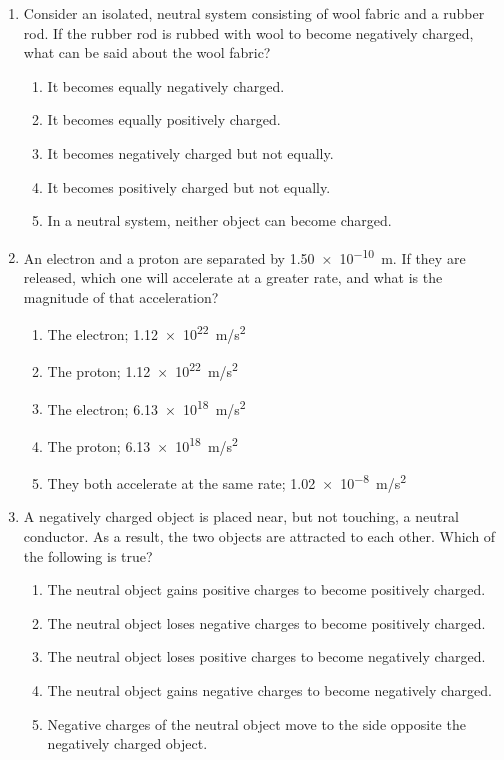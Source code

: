 \documentclass{../../../oss-apphys}
\begin{document}
\begin{multicols*}{2}
\begin{enumerate}[leftmargin=18pt]
  \item Consider an isolated, neutral system consisting of wool fabric and a
    rubber rod. If the rubber rod is rubbed with wool to become negatively
    charged, what can be said about the wool fabric?
    \begin{enumerate}[nosep,leftmargin=18pt,label=(\Alph*)]
    \item It becomes equally negatively charged.
    \item It becomes equally positively charged.
    \item It becomes negatively charged but not equally.
    \item It becomes positively charged but not equally.
    \item In a neutral system, neither object can become charged.
    \end{enumerate}
    \columnbreak
    
  \item An electron and a proton are separated by \SI{1.50e-10}{m}. If they are
    released, which one will accelerate at a greater rate, and what is the
    magnitude of that acceleration?
    \begin{enumerate}[nosep,leftmargin=18pt,label=(\Alph*)]
    \item The electron; \SI{1.12e22}{m/s^2}
    \item The proton; \SI{1.12e22}{m/s^2}
    \item The electron; \SI{6.13e18}{m/s^2}
    \item The proton; \SI{6.13e18}{m/s^2}
    \item They both accelerate at the same rate; \SI{1.02e-8}{m/s^2}
    \end{enumerate}
    
  \item A negatively charged object is placed near, but not touching, a neutral
    conductor. As a result, the two objects are attracted to each other. Which
    of the following is true?
    \begin{enumerate}[nosep,leftmargin=18pt,label=(\Alph*)]
    \item The neutral object gains positive charges to become positively
      charged.
    \item The neutral object loses negative charges to become positively charged.
    \item The neutral object loses positive charges to become negatively
      charged.
    \item The neutral object gains negative charges to become negatively
      charged.
    \item Negative charges of the neutral object move to the side opposite
      the negatively charged object.
    \end{enumerate}
    

\end{enumerate}
\end{multicols*}
\end{document}
